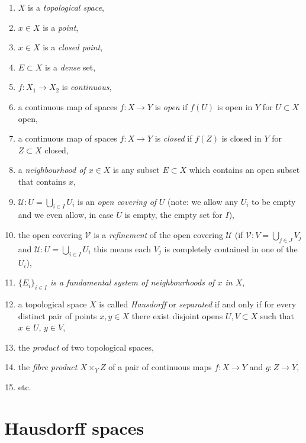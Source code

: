 \begin{enumerate}
\item
\label{item-space}
$X$ is a {\it topological space},
\item
\label{item-point}
$x\in X$ is a {\it point},
\item
\label{item-closed-point}
$x\in X$ is a {\it closed point},
\item
\label{item-dense}
$E \subset X$ is a {\it dense} set,
\item
\label{item-continuous}
$f : X_1 \to X_2$ is {\it continuous},
\item a continuous map of spaces $f : X \to Y$ is
{\it open} if $f(U)$ is open in $Y$ for $U \subset X$ open,
\item a continuous map of spaces $f : X \to Y$ is
{\it closed} if $f(Z)$ is closed in $Y$ for $Z \subset X$ closed,
\item
\label{item-neighbourhood}
a {\it neighbourhood of $x \in X$} is any subset
$E \subset X$ which contains an open subset that
contains $x$,
\item
\label{item-covering}
$\mathcal{U} : U = \bigcup_{i \in I} U_i$ is an
{\it open covering of} $U$ (note: we allow any $U_i$ to be empty
and we even allow, in case $U$ is empty, the empty set for $I$),
\item
\label{item-refinement}
the open covering $\mathcal{V}$ is a {\it refinement}
of the open covering $\mathcal{U}$ (if
$\mathcal{V} : V = \bigcup_{j \in J} V_j$ and
$\mathcal{U} : U = \bigcup_{i \in I} U_i$
this means each $V_j$ is completely contained in one of the $U_i$),
\item
\label{item-fundamental-system}
{\it $\{ E_i \}_{i \in I}$ is a fundamental system of neighbourhoods
of $x$ in $X$},
\item
\label{item-Hausdorff}
a topological space $X$ is called {\it Hausdorff} or {\it separated}
if and only if for every distinct pair of points $x, y \in X$ there exist
disjoint opens $U, V \subset X$ such that $x \in U$, $y \in V$,
\item the {\it product} of two topological spaces,
\label{item-product}
\item
\label{item-fibre-product}
the {\it fibre product $X \times_Y Z$} of a pair of continuous maps
$f : X \to Y$ and $g : Z \to Y$,
\item etc.
\end{enumerate}



\section{Hausdorff spaces}
\label{section-Hausdorff}

